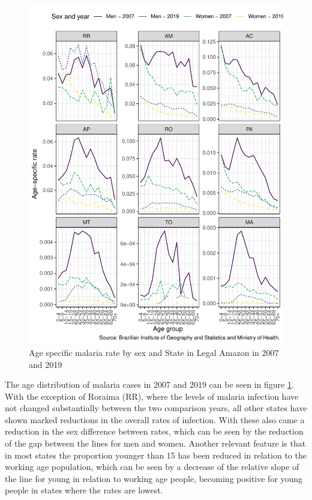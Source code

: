 \documentclass[
  12pt,
]{article}
\begin{document}
\begin{figure}
\centering
\includegraphics{taxa-especifica-uf.pdf}
\caption{\label{fig:tx-malaria}Age specific malaria rate by sex and State in Legal Amazon in 2007 and 2019}
\end{figure}

The age distribution of malaria cases in 2007 and 2019 can be seen in figure \ref{fig:tx-malaria}. With the exception of Roraima (RR), where the levels of malaria infection have not changed substantially between the two comparison years, all other states have shown marked reductions in the overall rates of infection. With these also came a reduction in the sex difference between rates, which can be seen by the reduction of the gap between the lines for men and women. Another relevant feature is that in most states the proportion younger than 15 has been reduced in relation to the working age population, which can be seen by a decrease of the relative slope of the line for young in relation to working age people, becoming positive for young people in states where the rates are lowest.
\end{document}
